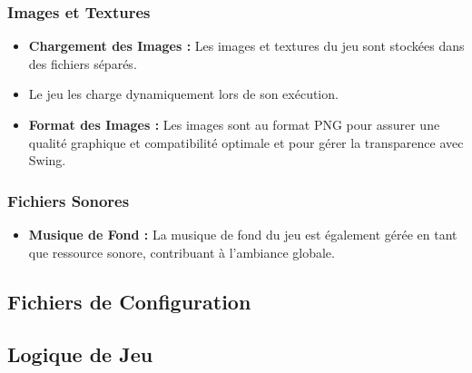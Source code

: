 \documentclass{article}
\begin{document}
    \subsubsection*{Images et Textures}

    \begin{itemize}
        \item \textbf{Chargement des Images :} Les images et textures du jeu sont stockées dans des fichiers séparés.

        \item Le jeu les charge dynamiquement lors de son exécution.

        \item \textbf{Format des Images :} Les images sont au format PNG pour assurer une qualité graphique et compatibilité optimale et pour gérer la transparence avec Swing. 
    \end{itemize}

    \subsubsection*{Fichiers Sonores}

    \begin{itemize}
        \item \textbf{Musique de Fond :} La musique de fond du jeu est également gérée en tant que ressource sonore, contribuant à l'ambiance globale.
    \end{itemize}

    \subsection{Fichiers de Configuration}\label{subsec:fichiers-de-configuration}


    \subsection{Logique de Jeu}\label{subsec:logique-de-jeu}
\end{document}

